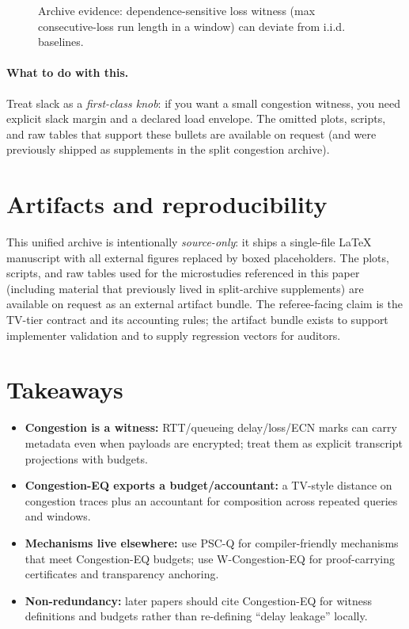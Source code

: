 \documentclass[11pt]{article}
\theoremstyle{definition}
\theoremstyle{remark}
\begin{document}
\begin{figure}[t]
\centering
{}
\caption{Archive evidence: dependence-sensitive loss witness (max consecutive-loss run length in a window) can deviate from i.i.d. baselines.}
\label{fig:mm1krun}
\end{figure}

\paragraph{What to do with this.}
Treat slack as a \emph{first-class knob}: if you want a small congestion witness, you need explicit slack margin and a declared load envelope.
The omitted plots, scripts, and raw tables that support these bullets are available on request (and were previously shipped as supplements in the split congestion archive).


\section{Artifacts and reproducibility}
This unified archive is intentionally \emph{source-only}: it ships a single-file \LaTeX{} manuscript with all external figures replaced by boxed placeholders.
The plots, scripts, and raw tables used for the microstudies referenced in this paper (including material that previously lived in split-archive supplements) are available on request as an external artifact bundle.
The referee-facing claim is the TV-tier contract and its accounting rules; the artifact bundle exists to support implementer validation and to supply regression vectors for auditors.

\section{Takeaways}
\begin{itemize}[leftmargin=*]
\item \textbf{Congestion is a witness:} RTT/queueing delay/loss/ECN marks can carry metadata even when payloads are encrypted; treat them as explicit transcript projections with budgets.
\item \textbf{Congestion-EQ exports a budget/accountant:} a TV-style distance on congestion traces plus an accountant for composition across repeated queries and windows.
\item \textbf{Mechanisms live elsewhere:} use PSC-Q for compiler-friendly mechanisms that meet Congestion-EQ budgets; use W-Congestion-EQ for proof-carrying certificates and transparency anchoring.
\item \textbf{Non-redundancy:} later papers should cite Congestion-EQ for witness definitions and budgets rather than re-defining ``delay leakage'' locally.
\end{itemize}
\end{document}
